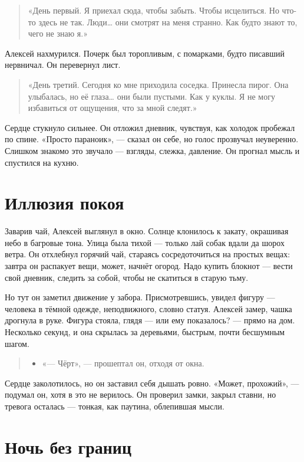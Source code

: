 \documentclass[12pt,a4paper]{book}
\newenvironment{dialogue}{\begin{quote}\itshape\begin{itemize}\item[]}{\end{itemize}\end{quote}}
\begin{document}
\begin{quote}
«День первый. Я приехал сюда, чтобы забыть. Чтобы исцелиться. Но что-то здесь не так. Люди… они смотрят на меня странно. Как будто знают то, чего не знаю я.»
\end{quote}

Алексей нахмурился. Почерк был торопливым, с помарками, будто писавший нервничал. Он перевернул лист.

\begin{quote}
«День третий. Сегодня ко мне приходила соседка. Принесла пирог. Она улыбалась, но её глаза… они были пустыми. Как у куклы. Я не могу избавиться от ощущения, что за мной следят.»
\end{quote}

Сердце стукнуло сильнее. Он отложил дневник, чувствуя, как холодок пробежал по спине. «Просто параноик», — сказал он себе, но голос прозвучал неуверенно. Слишком знакомо это звучало — взгляды, слежка, давление. Он прогнал мысль и спустился на кухню.

\section{Иллюзия покоя}

Заварив чай, Алексей выглянул в окно. Солнце клонилось к закату, окрашивая небо в багровые тона. Улица была тихой — только лай собак вдали да шорох ветра. Он отхлебнул горячий чай, стараясь сосредоточиться на простых вещах: завтра он распакует вещи, может, начнёт огород. Надо купить блокнот — вести свой дневник, следить за собой, чтобы не скатиться в старую тьму.

Но тут он заметил движение у забора. Присмотревшись, увидел фигуру — человека в тёмной одежде, неподвижного, словно статуя. Алексей замер, чашка дрогнула в руке. Фигура стояла, глядя — или ему показалось? — прямо на дом. Несколько секунд, и она скрылась за деревьями, быстрым, почти бесшумным шагом.

\begin{dialogue}
«— Чёрт», — прошептал он, отходя от окна.
\end{dialogue}

Сердце заколотилось, но он заставил себя дышать ровно. «Может, прохожий», — подумал он, хотя в это не верилось. Он проверил замки, закрыл ставни, но тревога осталась — тонкая, как паутина, облепившая мысли.

\section{Ночь без границ}
\end{document}
